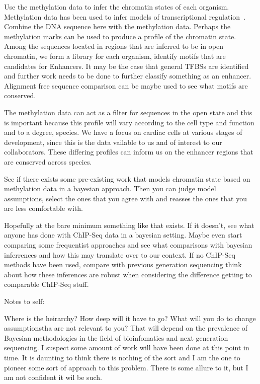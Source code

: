 Use the methylation data to infer the chromatin states of each organism. Methylation data has been used to infer models of transcriptional regulation~\cite{duren2017modeling}. Combine the DNA sequence here with the methylation data. 
Perhaps the methylation marks can be used to produce a profile of the chromatin state. 
Among the sequences located in regions that are inferred to be in open chromatin, we form a library for each organism, identify motifs that are candidates for Enhancers. It may be the case that general TFBSs are identified and further work needs to be done to further classify something as an enhancer. Alignment free sequence comparison can be maybe used to see what motifs are conserved. 

The methylation data can act as a filter for sequences in the open state and this is important because this profile will vary according to the cell type and function and to a degree, species. We have a focus on cardiac cells at various stages of development, since this is the data vailable to us and of interest to our collaborators. These differing profiles can inform us on the enhancer regions that are conserved across species. 

See if there exists some pre-existing work that models chromatin state based on methylation data in a bayesian approach. Then you can judge model assumptions, select the ones that you agree with and reasses the ones that you are less comfortable with. 

Hopefully at the bare minimum something like that exists. If it doesn't, see what anyone has done with ChIP-Seq data in a bayesian setting. Maybe even start comparing some frequentist approaches and see what comparisons with bayesian inferrences and how this may translate over to our context. If no ChIP-Seq methods have been used, compare with previous generation sequencing think about how these inferences are robust when considering the difference getting to comparable ChIP-Seq stuff. 

Notes to self:

Where is the heirarchy? How deep will it have to go? What will you do to change assumptionstha are not relevant to you? That will depend on the prevalence of Bayesian methodologies in the field of bioinfomatics and next generation sequencing. I suspect some amount of work will have been done at this point in time. It is daunting to think there is nothing of the sort and I am the one to pioneer some sort of approach to this problem. There is some allure to it, but I am not confident it wil be such. 